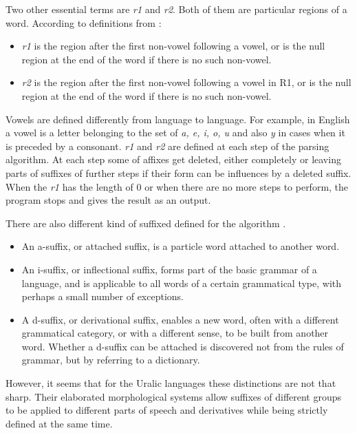 \documentclass[a4paper,notitlepage]{article}
\begin{document}
Two other essential terms are \textit{r1} and \textit{r2}. Both of them are particular regions of a word. According to definitions from \citep{snowball_old}:

\begin{itemize}
    \item \textit{r1} is the region after the first non-vowel following a vowel, or is the null region at the end of the word if there is no such non-vowel.
    \item \textit{r2} is the region after the first non-vowel following a vowel in R1, or is the null region at the end of the word if there is no such non-vowel.
\end{itemize}

Vowels are defined differently from language to language. For example, in English a vowel is a letter belonging to the set of  \textit{a, e, i, o, u}  and also \textit{y} in cases when it is preceded by a consonant. \newline
\emph{r1} and \emph{r2} are defined at each step of the parsing algorithm. At each step some of affixes get deleted, either completely or leaving parts of suffixes of further steps if their form can be influences by a deleted suffix. When the \emph{r1} has the length of 0 or when there are no more steps to perform, the program stops and gives the result as an output.

There are also different kind of suffixed defined for the algorithm \citep{snowball_old}.

\begin{itemize}
    \item An a-suffix, or attached suffix, is a particle word attached to another word.
    \item An i-suffix, or inflectional suffix, forms part of the basic grammar of a language, and is applicable to all words of a certain grammatical type, with perhaps a small number of exceptions.
    \item A d-suffix, or derivational suffix, enables a new word, often with a different grammatical category, or with a different sense, to be built from another word. Whether a d-suffix can be attached is discovered not from the rules of grammar, but by referring to a dictionary.
\end{itemize}

However, it seems that for the Uralic languages these distinctions are not that sharp. Their elaborated morphological systems allow suffixes of different groups to be applied to different parts of speech and derivatives while being strictly defined at the same time.
\end{document}

